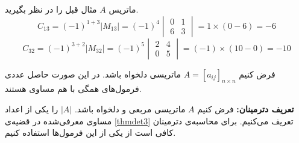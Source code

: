 \begin{example}
	ماتریس $A$ مثال قبل را در نظر بگیرید.
	\[
	C_{13} = (-1)^{1+3} \left|M_{13}\right| = (-1)^4
	\begin{vmatrix}
		0 & 1 \\
		6 & 3
	\end{vmatrix}
	= 1 \times (0-6) = -6
	\]
	\[
	C_{32} = (-1)^{3+2} \left|M_{32}\right| = (-1)^5
	\begin{vmatrix}
		2 & 4 \\
		0 & 5
	\end{vmatrix}
	= (-1) \times (10 - 0) = -10
	\]
\end{example}

\begin{theorem} \label{thmdet3}
	فرض کنیم
	$A=[a_{ij}]_{n \times n}$
	ماتریسی دلخواه باشد. در این صورت حاصل عددی فرمول‌های
	همگی با هم مساوی هستند.
\end{theorem}
\smallskip
\textbf{تعریف دترمینان:}
فرض کنیم $A$ ماتریسی مربعی و دلخواه باشد.
$|A|$
را یکی از اعداد مساوی معرفی‌شده در قضیه‌ی
\ref{thmdet3}
تعریف می‌کنیم. برای محاسبه‌ی دترمینان کافی است از یکی از این فرمول‌ها استفاده کنیم.

